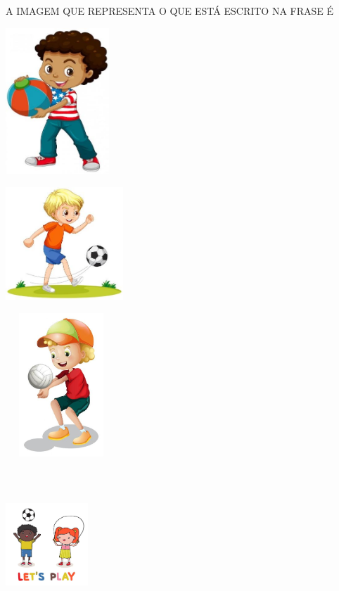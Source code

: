 A IMAGEM QUE REPRESENTA O QUE ESTÁ ESCRITO NA FRASE É

\begin{escolha}
\item \includegraphics[width=1.53194in,height=2.16250in]{media/image199.jpg}

\item \includegraphics[width=1.73760in,height=1.66822in]{media/image200.jpg}

\item \includegraphics[width=1.65208in,height=2.13056in]{media/image201.jpg}

\item \includegraphics[width=1.21736in,height=2.20972in]{media/image202.jpg}
\end{escolha}

